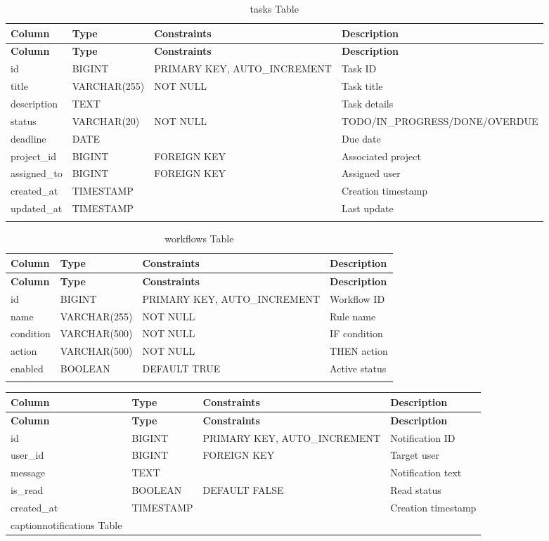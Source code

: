 \documentclass[12pt,a4paper,twoside]{book}
\begin{document}
\begin{longtable}{|l|l|l|l|}
\hline
\textbf{Column} & \textbf{Type} & \textbf{Constraints} & \textbf{Description} \\ \hline
\endfirsthead
\hline
\textbf{Column} & \textbf{Type} & \textbf{Constraints} & \textbf{Description} \\ \hline
\endhead
id & BIGINT & PRIMARY KEY, AUTO\_INCREMENT & Task ID \\ \hline
title & VARCHAR(255) & NOT NULL & Task title \\ \hline
description & TEXT & & Task details \\ \hline
status & VARCHAR(20) & NOT NULL & TODO/IN\_PROGRESS/DONE/OVERDUE \\ \hline
deadline & DATE & & Due date \\ \hline
project\_id & BIGINT & FOREIGN KEY & Associated project \\ \hline
assigned\_to & BIGINT & FOREIGN KEY & Assigned user \\ \hline
created\_at & TIMESTAMP & & Creation timestamp \\ \hline
updated\_at & TIMESTAMP & & Last update \\ \hline
\caption{tasks Table}
\end{longtable}

\begin{longtable}{|l|l|l|l|}
\hline
\textbf{Column} & \textbf{Type} & \textbf{Constraints} & \textbf{Description} \\ \hline
\endfirsthead
\hline
\textbf{Column} & \textbf{Type} & \textbf{Constraints} & \textbf{Description} \\ \hline
\endhead
id & BIGINT & PRIMARY KEY, AUTO\_INCREMENT & Workflow ID \\ \hline
name & VARCHAR(255) & NOT NULL & Rule name \\ \hline
condition & VARCHAR(500) & NOT NULL & IF condition \\ \hline
action & VARCHAR(500) & NOT NULL & THEN action \\ \hline
enabled & BOOLEAN & DEFAULT TRUE & Active status \\ \hline
\caption{workflows Table}
\end{longtable}

\begin{longtable}{|l|l|l|l|}
\hline
\textbf{Column} & \textbf{Type} & \textbf{Constraints} & \textbf{Description} \\ \hline
\endfirsthead
\hline
\textbf{Column} & \textbf{Type} & \textbf{Constraints} & \textbf{Description} \\ \hline
\endhead
id & BIGINT & PRIMARY KEY, AUTO\_INCREMENT & Notification ID \\ \hline
user\_id & BIGINT & FOREIGN KEY & Target user \\ \hline
message & TEXT & & Notification text \\ \hline
is\_read & BOOLEAN & DEFAULT FALSE & Read status \\ \hline
created\_at & TIMESTAMP & & Creation timestamp \\ \hline
caption{notifications Table}
\end{longtable}
\end{document}
